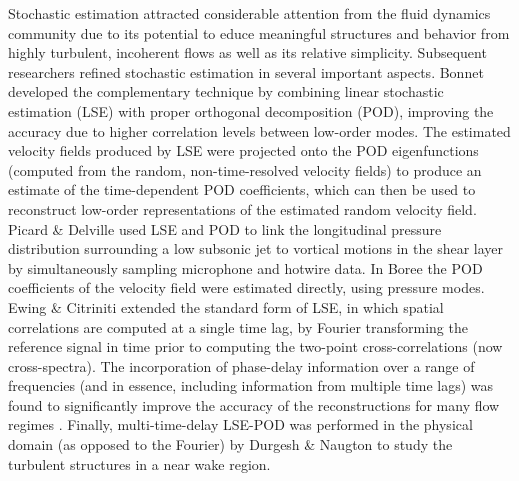 Stochastic estimation attracted considerable attention from the fluid dynamics community due to its potential to educe meaningful structures and behavior from highly turbulent, incoherent flows as well as its relative simplicity.
Subsequent researchers refined stochastic estimation in several important aspects.
Bonnet \etal \citep{Bonnet1994} developed the complementary technique by combining linear stochastic estimation (LSE) with proper orthogonal decomposition (POD), improving the accuracy due to higher correlation levels between low-order modes.
The estimated velocity fields produced by LSE were projected onto the POD eigenfunctions (computed from the random, non-time-resolved velocity fields) to produce an estimate of the time-dependent POD coefficients, which can then be used to reconstruct low-order representations of the estimated random velocity field.
Picard \& Delville \citep{Picard2000} used LSE and POD to link the longitudinal pressure distribution surrounding a low subsonic jet to vortical motions in the shear layer by simultaneously sampling microphone and hotwire data.
In Boree \citep{Boree2003} the POD coefficients of the velocity field were estimated directly, using pressure modes.
Ewing \& Citriniti \citep{Ewing1997} extended the standard form of LSE, in which spatial correlations are computed at a single time lag, by Fourier transforming the reference signal in time prior to computing the two-point cross-correlations (now cross-spectra). 
The incorporation of phase-delay information over a range of frequencies (and in essence, including information from multiple time lags) was found to significantly improve the accuracy of the reconstructions for many flow regimes \citep{Ewing1997,Tinney2006,Tinney2008b}.
Finally, multi-time-delay LSE-POD was performed in the physical domain (as opposed to the Fourier) by Durgesh \& Naugton \citep{Durgesh2010} to study the turbulent structures in a near wake region.

